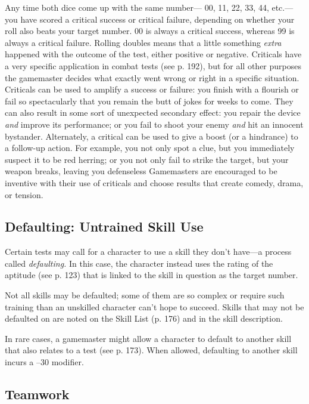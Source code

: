 Any time both dice come up with the same number—
00, 11, 22, 33, 44, etc.—you have scored a critical 
success or critical failure, depending on whether your 
roll also beats your target number. 00 is always a 
critical success, whereas 99 is always a critical failure. 
Rolling doubles means that a little something \textit{extra }
happened with the outcome of the test, either positive 
or negative. Criticals have a very specific application 
in combat tests (see p. 192), but for all other purposes 
the gamemaster decides what exactly went wrong or 
right in a specific situation. Criticals can be used to 
amplify a success or failure: you finish with a flourish
or fail so spectacularly that you remain the butt
of jokes for weeks to come. They can also result in 
some sort of unexpected secondary effect: you repair 
the device \textit{and} improve its performance; or you fail 
to shoot your enemy \textit{and} hit an innocent bystander. 
Alternately, a critical can be used to give a boost (or 
a hindrance) to a follow-up action. For example, you 
not only spot a clue, but you immediately suspect it 
to be red herring; or you not only fail to strike the 
target, but your weapon breaks, leaving you defenseless
Gamemasters are encouraged to be inventive with
their use of criticals and choose results that create 
comedy, drama, or tension.

\subsection{Defaulting: Untrained Skill Use}

Certain tests may call for a character to use a skill they 
don't have—a process called \textit{defaulting.} In this case, 
the character instead uses the rating of the aptitude 
(see p. 123) that is linked to the skill in question as the 
target number.

Not all skills may be defaulted; some of them are 
so complex or require such training than an unskilled 
character can't hope to succeed. Skills that may not be 
defaulted on are noted on the Skill List (p. 176) and in 
the skill description.

In rare cases, a gamemaster might allow a character 
to default to another skill that also relates to a test 
(see p. 173). When allowed, defaulting to another skill 
incurs a –30 modifier.

\subsection{Teamwork}


